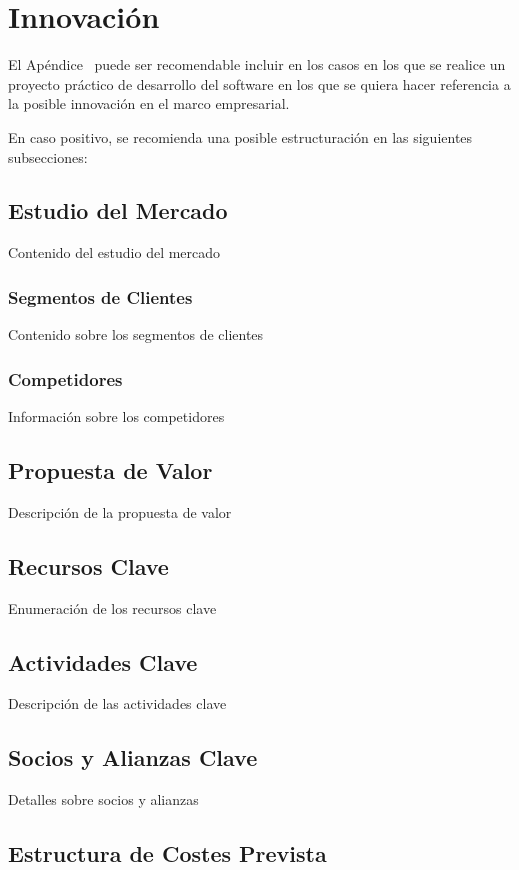 \chapter{Innovación}

El Apéndice \thechapter\  puede ser recomendable incluir en los casos en los que se realice un proyecto práctico de desarrollo del software en los que se quiera hacer referencia a la posible innovación en el marco empresarial.

En caso positivo, se recomienda una posible estructuración en las siguientes subsecciones:

\section{Estudio del Mercado}
Contenido del estudio del mercado

\subsection{Segmentos de Clientes}
Contenido sobre los segmentos de clientes

\subsection{Competidores}
Información sobre los competidores

\section{Propuesta de Valor}
Descripción de la propuesta de valor

\section{Recursos Clave}
Enumeración de los recursos clave

\section{Actividades Clave}
Descripción de las actividades clave

\section{Socios y Alianzas Clave}
Detalles sobre socios y alianzas

\section{Estructura de Costes Prevista}

